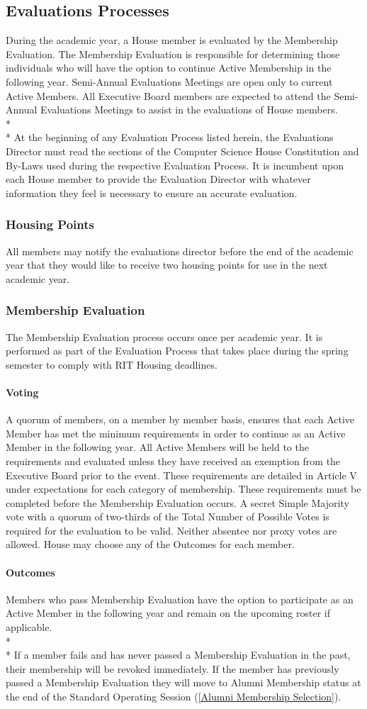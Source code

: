 \documentclass{article}
\newcommand{\bsection}[1]{\subsection{#1} \label{#1}}
\newcommand{\bsubsection}[1]{\subsubsection{#1} \label{#1}}
\newcommand{\bsubsubsection}[1]{\paragraph{#1} \label{#1}}
\begin{document}
\bsection{Evaluations Processes}
During the academic year, a House member is evaluated by the Membership Evaluation.
The Membership Evaluation is responsible for determining those individuals who will have the option to continue Active Membership in the following year.
Semi-Annual Evaluations Meetings are open only to current Active Members.
All Executive Board members are expected to attend the Semi-Annual Evaluations Meetings to assist in the evaluations of House members.
\\* \\*
At the beginning of any Evaluation Process listed herein, the Evaluations Director must read the sections of the Computer Science House Constitution and By-Laws used during the respective Evaluation Process.
It is incumbent upon each House member to provide the Evaluation Director with whatever information they feel is necessary to ensure an accurate evaluation.
\bsubsection{Housing Points}
All members may notify the evaluations director before the end of the academic year that they would like to receive two housing points for use in the next academic year.
\bsubsection{Membership Evaluation}
The Membership Evaluation process occurs once per academic year. It is performed as part of the Evaluation Process that takes place during the spring semester to comply with RIT Housing deadlines.
\bsubsubsection{Voting} 
A quorum of members, on a member by member basis, ensures that each Active Member has met the minimum requirements in order to continue as an Active Member in the following year.
All Active Members will be held to the requirements and evaluated unless they have received an exemption from the Executive Board prior to the event.
These requirements are detailed in Article V under expectations for each category of membership.
These requirements must be completed before the Membership Evaluation occurs.
A secret Simple Majority vote with a quorum of two-thirds of the Total Number of Possible Votes is required for the evaluation to be valid.
Neither absentee nor proxy votes are allowed.
House may choose any of the Outcomes for each member.
\bsubsubsection{Outcomes}
Members who pass Membership Evaluation have the option to participate as an Active Member in the following year and remain on the upcoming roster if applicable.
\\* \\*
If a member fails and has never passed a Membership Evaluation in the past, their membership will be revoked immediately.
If the member has previously passed a Membership Evaluation they will move to Alumni Membership status at the end of the Standard Operating Session (\ref{Alumni Membership Selection}).
\end{document}
